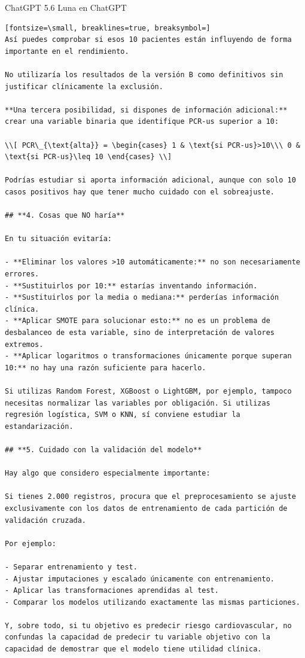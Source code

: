 \documentclass[12pt,a4paper,oneside]{book}
\begin{document}
\begin{iaresp}{ChatGPT 5.6 Luna en ChatGPT}
\begin{Verbatim}[fontsize=\small, breaklines=true, breaksymbol=]
Así puedes comprobar si esos 10 pacientes están influyendo de forma importante en el rendimiento.

No utilizaría los resultados de la versión B como definitivos sin justificar clínicamente la exclusión.

**Una tercera posibilidad, si dispones de información adicional:** crear una variable binaria que identifique PCR-us superior a 10:

\\[ PCR\_{\text{alta}} = \begin{cases} 1 & \text{si PCR-us}>10\\\ 0 & \text{si PCR-us}\leq 10 \end{cases} \\]

Podrías estudiar si aporta información adicional, aunque con solo 10 casos positivos hay que tener mucho cuidado con el sobreajuste.

## **4. Cosas que NO haría**

En tu situación evitaría:

- **Eliminar los valores >10 automáticamente:** no son necesariamente errores.
- **Sustituirlos por 10:** estarías inventando información.
- **Sustituirlos por la media o mediana:** perderías información clínica.
- **Aplicar SMOTE para solucionar esto:** no es un problema de desbalanceo de esta variable, sino de interpretación de valores extremos.
- **Aplicar logaritmos o transformaciones únicamente porque superan 10:** no hay una razón suficiente para hacerlo.

Si utilizas Random Forest, XGBoost o LightGBM, por ejemplo, tampoco necesitas normalizar las variables por obligación. Si utilizas regresión logística, SVM o KNN, sí conviene estudiar la estandarización.

## **5. Cuidado con la validación del modelo**

Hay algo que considero especialmente importante:

Si tienes 2.000 registros, procura que el preprocesamiento se ajuste exclusivamente con los datos de entrenamiento de cada partición de validación cruzada.

Por ejemplo:

- Separar entrenamiento y test.
- Ajustar imputaciones y escalado únicamente con entrenamiento.
- Aplicar las transformaciones aprendidas al test.
- Comparar los modelos utilizando exactamente las mismas particiones.

Y, sobre todo, si tu objetivo es predecir riesgo cardiovascular, no confundas la capacidad de predecir tu variable objetivo con la capacidad de demostrar que el modelo tiene utilidad clínica.


\end{Verbatim}
\end{iaresp}
\end{document}
